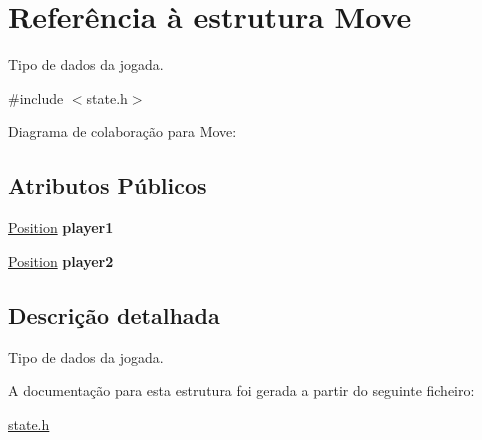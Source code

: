 \hypertarget{structMove}{}\section{Referência à estrutura Move}
\label{structMove}


Tipo de dados da jogada.  




{\ttfamily \#include $<$state.\+h$>$}



Diagrama de colaboração para Move\+:
\subsection*{Atributos Públicos}
\begin{DoxyCompactItemize}
\item 
\mbox{\label{structMove_abd95c78fcfe275f416eb19dba4452cca}} 
\hyperlink{structPosition}{Position} {\bfseries player1}
\item 
\mbox{\label{structMove_ab8155f78b4e25c2743e2792e77a5271e}} 
\hyperlink{structPosition}{Position} {\bfseries player2}
\end{DoxyCompactItemize}


\subsection{Descrição detalhada}
Tipo de dados da jogada. 

A documentação para esta estrutura foi gerada a partir do seguinte ficheiro\+:\begin{DoxyCompactItemize}
\item 
\hyperlink{state_8h}{state.\+h}\end{DoxyCompactItemize}
